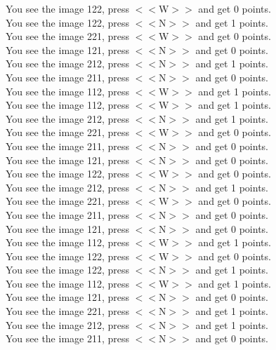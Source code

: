 \documentclass[pdflatex,sn-nature]{sn-jnl}%
\theoremstyle{thmstyleone}%
\theoremstyle{thmstyletwo}%
\theoremstyle{thmstylethree}%
\begin{document}
You see the image 122, press $<<$W$>>$ and get 0 points. $~$\\ 
You see the image 122, press $<<$N$>>$ and get 1 points. $~$\\ 
You see the image 221, press $<<$W$>>$ and get 0 points. $~$\\ 
You see the image 121, press $<<$N$>>$ and get 0 points. $~$\\ 
You see the image 212, press $<<$N$>>$ and get 1 points. $~$\\ 
You see the image 211, press $<<$N$>>$ and get 0 points. $~$\\ 
You see the image 112, press $<<$W$>>$ and get 1 points. $~$\\ 
You see the image 112, press $<<$W$>>$ and get 1 points. $~$\\ 
You see the image 212, press $<<$N$>>$ and get 1 points. $~$\\ 
You see the image 221, press $<<$W$>>$ and get 0 points. $~$\\ 
You see the image 211, press $<<$N$>>$ and get 0 points. $~$\\ 
You see the image 121, press $<<$N$>>$ and get 0 points. $~$\\ 
You see the image 122, press $<<$W$>>$ and get 0 points. $~$\\ 
You see the image 212, press $<<$N$>>$ and get 1 points. $~$\\ 
You see the image 221, press $<<$W$>>$ and get 0 points. $~$\\ 
You see the image 211, press $<<$N$>>$ and get 0 points. $~$\\ 
You see the image 121, press $<<$N$>>$ and get 0 points. $~$\\ 
You see the image 112, press $<<$W$>>$ and get 1 points. $~$\\ 
You see the image 122, press $<<$W$>>$ and get 0 points. $~$\\ 
You see the image 122, press $<<$N$>>$ and get 1 points. $~$\\ 
You see the image 112, press $<<$W$>>$ and get 1 points. $~$\\ 
You see the image 121, press $<<$N$>>$ and get 0 points. $~$\\ 
You see the image 221, press $<<$N$>>$ and get 1 points. $~$\\ 
You see the image 212, press $<<$N$>>$ and get 1 points. $~$\\ 
You see the image 211, press $<<$N$>>$ and get 0 points. $~$\\ 
\end{document}
